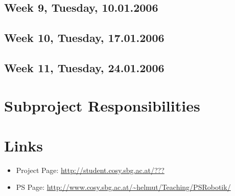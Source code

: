 \documentclass[12pt,fleqn,a4paper]{article}
\begin{document}
\subsection{Week 9, Tuesday, 10.01.2006}

\subsection{Week 10, Tuesday, 17.01.2006}

\subsection{Week 11, Tuesday, 24.01.2006}

\newpage

\section{Subproject Responsibilities} %
\newpage


\section{Links}

\begin{itemize}
\item Project Page: \url{http://student.cosy.sbg.ac.at/???}
\item PS Page:
\url{http://www.cosy.sbg.ac.at/~helmut/Teaching/PSRobotik/}

\end{itemize}

\end{document}
